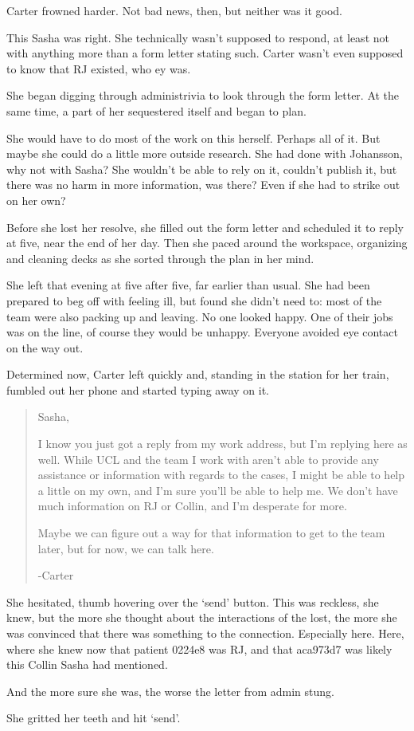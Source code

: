 Carter frowned harder. Not bad news, then, but neither was it good.

This Sasha was right. She technically wasn't supposed to respond, at least not with anything more than a form letter stating such. Carter wasn't even supposed to know that RJ existed, who ey was.

She began digging through administrivia to look through the form letter. At the same time, a part of her sequestered itself and began to plan.

She would have to do most of the work on this herself. Perhaps all of it. But maybe she could do a little more outside research. She had done with Johansson, why not with Sasha? She wouldn't be able to rely on it, couldn't publish it, but there was no harm in more information, was there? Even if she had to strike out on her own?

Before she lost her resolve, she filled out the form letter and scheduled it to reply at five, near the end of her day. Then she paced around the workspace, organizing and cleaning decks as she sorted through the plan in her mind.

She left that evening at five after five, far earlier than usual. She had been prepared to beg off with feeling ill, but found she didn't need to: most of the team were also packing up and leaving. No one looked happy. One of their jobs was on the line, of course they would be unhappy. Everyone avoided eye contact on the way out.

Determined now, Carter left quickly and, standing in the station for her train, fumbled out her phone and started typing away on it.

\begin{quote}
Sasha,

I know you just got a reply from my work address, but I'm replying here as well. While UCL and the team I work with aren't able to provide any assistance or information with regards to the cases, I might be able to help a little on my own, and I'm sure you'll be able to help me. We don't have much information on RJ or Collin, and I'm desperate for more.

Maybe we can figure out a way for that information to get to the team later, but for now, we can talk here.

-Carter
\end{quote}

She hesitated, thumb hovering over the `send' button. This was reckless, she knew, but the more she thought about the interactions of the lost, the more she was convinced that there was something to the connection. Especially here. Here, where she knew now that patient 0224e8 was RJ, and that aca973d7 was likely this Collin Sasha had mentioned.

And the more sure she was, the worse the letter from admin stung.

She gritted her teeth and hit `send'.
